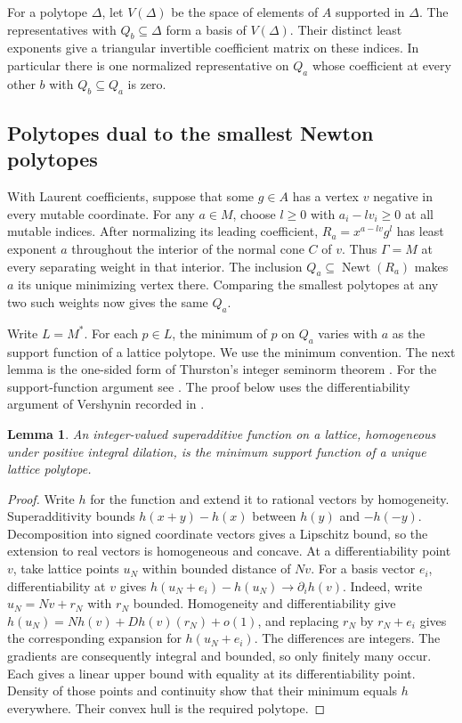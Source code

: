 \documentclass[11pt,reqno]{amsart}
\numberwithin{equation}{section}
\newtheorem{lemma}[theorem]{Lemma}
\theoremstyle{definition}
\theoremstyle{remark}
\DeclareMathOperator{\Newt}{Newt}
\begin{document}
For a polytope \(\Delta\), let \(V(\Delta)\) be the space of elements
of \(A\) supported in \(\Delta\). The representatives with
\(Q_b\subseteq\Delta\) form a basis of \(V(\Delta)\).
Their distinct least exponents give a triangular invertible
coefficient matrix on these indices. In particular there is one
normalized representative on \(Q_a\) whose coefficient at every
other \(b\) with \(Q_b\subseteq Q_a\) is zero.

\subsection{Polytopes dual to the smallest Newton polytopes}

With Laurent coefficients, suppose that some \(g\in A\) has a
vertex \(v\) negative in every mutable coordinate. For any \(a\in
M\), choose \(l\ge0\) with \(a_i-lv_i\ge0\) at all mutable indices.
After normalizing its leading coefficient,
\(R_a=x^{a-lv}g^l\) has least exponent \(a\) throughout the
interior of the normal cone \(C\) of \(v\). Thus \(\Gamma=M\)
at every separating weight in that interior. The inclusion
\(Q_a\subseteq\Newt(R_a)\) makes \(a\) its unique minimizing
vertex there. Comparing the smallest polytopes at any two such
weights now gives the same \(Q_a\).

Write \(L=M^*\). For each
\(p\in L\), the minimum of \(p\) on \(Q_a\) varies with \(a\) as the
support function of a lattice polytope. We use the minimum convention.
The next lemma is the one-sided form of Thurston's integer seminorm
theorem \cite{Thurston}. For the support-function argument see \cite[Lemma~0.1 and the proof
of Theorem~1]{deLaSalle}. The proof below uses the differentiability
argument of Vershynin recorded in \cite[Lemma~4]{KapovichInt}.

\begin{lemma}\label{lem:integral-support}
An integer-valued superadditive function on a lattice, homogeneous
under positive integral dilation, is the minimum support function
of a unique lattice polytope.
\end{lemma}
\begin{proof}
Write \(h\) for the function and extend it to rational vectors by
homogeneity. Superadditivity bounds \(h(x+y)-h(x)\) between \(h(y)\)
and \(-h(-y)\).
Decomposition into signed coordinate vectors gives a Lipschitz bound,
so the extension to real vectors is homogeneous and concave.
At a differentiability point \(v\), take lattice points \(u_N\)
within bounded distance of \(Nv\). For a basis vector \(e_i\),
differentiability at \(v\) gives
\(h(u_N+e_i)-h(u_N)\to\partial_i h(v)\). Indeed, write
\(u_N=Nv+r_N\) with \(r_N\) bounded. Homogeneity and differentiability
give \(h(u_N)=Nh(v)+Dh(v)(r_N)+o(1)\), and replacing \(r_N\) by
\(r_N+e_i\) gives the corresponding expansion for \(h(u_N+e_i)\).
The differences are integers. The gradients are consequently integral and bounded,
so only finitely many occur. Each gives a linear upper bound with
equality at its differentiability point. Density of those points
and continuity show that their minimum equals \(h\) everywhere.
Their convex hull is the required polytope.
\end{proof}
\end{document}
